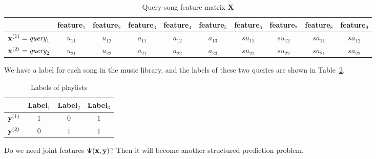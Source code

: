 \begin{table}[h!]
\centering
\begin{tabular}{l|cc|ccccccc} \hline \hline
& feature$_1$ & feature$_2$ & feature$_3$ & feature$_4$ & feature$_5$ & feature$_6$ & feature$_7$ & feature$_8$ & feature$_9$ \\ \hline
$\mathbf{x}^{({1})} = \textit{query}_1$
& $u_{11}$ & $u_{12}$ 
& $a_{11}$ & $a_{12}$ & $a_{13}$ & $su_{11}$ & $su_{12}$ & $sa_{11}$ & $sa_{12}$ \\
$\mathbf{x}^{({2})} = \textit{query}_2$ 
& $u_{21}$ & $u_{22}$ 
& $a_{21}$ & $a_{22}$ & $a_{23}$ & $su_{21}$ & $su_{22}$ & $sa_{21}$ & $sa_{22}$ \\ \hline
\end{tabular}
\caption{Query-song feature matrix $\mathbf{X}$}
\label{tab:trainx}
\end{table}

We have a label for each song in the music library, and the labels of these two queries are shown in Table~\ref{tab:trainy}.

\begin{table}[h!]
\centering
\begin{tabular}{l|ccc} \hline \hline
& Label$_1$ & Label$_2$ & Label$_3$ \\ \hline
$\mathbf{y}^{({1})}$ & $1$ & $0$ & $1$ \\
$\mathbf{y}^{({2})}$ & $0$ & $1$ & $1$ \\ \hline
\end{tabular}
\caption{Labels of playlists}
\label{tab:trainy}
\end{table}

Do we need joint features $\Psi(\mathbf{x}, \mathbf{y})$? Then it will become another structured prediction problem.


